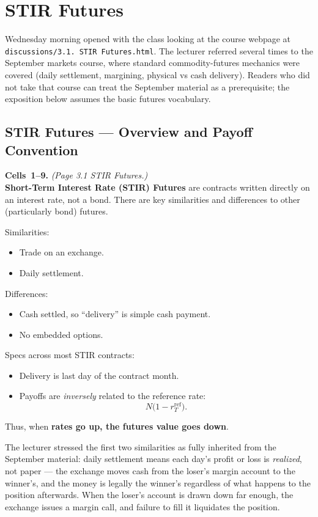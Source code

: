 \section{STIR Futures}\label{L3-sec:stir}

Wednesday morning opened with the class looking at the course webpage at
\texttt{discussions/3.1.~STIR Futures.html}. The lecturer referred several
times to the September markets course, where standard commodity-futures
mechanics were covered (daily settlement, margining, physical vs cash
delivery). Readers who did not take that course can treat the September
material as a prerequisite; the exposition below assumes the basic futures
vocabulary.

\subsection{STIR Futures --- Overview and Payoff Convention}\label{L3-sec:stir-overview}

\begin{keyblock}
\textbf{Cells~1--9.} \emph{(Page 3.1 \textperiodcentered{} STIR Futures.)}\\
\noindent \textbf{Short-Term Interest Rate (STIR) Futures} are contracts
written directly on an interest rate, not a bond.
There are key similarities and differences to other (particularly bond)
futures.

Similarities:
\begin{itemize}
  \item Trade on an exchange.
  \item Daily settlement.
\end{itemize}
Differences:
\begin{itemize}
  \item Cash settled, so ``delivery'' is simple cash payment.
  \item No embedded options.
\end{itemize}

Specs across most STIR contracts:
\begin{itemize}
  \item Delivery is last day of the contract month.
  \item Payoffs are \emph{inversely} related to the reference rate:
    \[
      N\bigl(1 - r^{\text{ref}}_T\bigr).
    \]
\end{itemize}
Thus, when \textbf{rates go up, the futures value goes down}.
\end{keyblock}

The lecturer stressed the first two similarities as fully inherited from
the September material: daily settlement means each day's profit or loss
is \emph{realized}, not paper --- the exchange moves cash from the loser's
margin account to the winner's, and the money is legally the winner's
regardless of what happens to the position afterwards. When the loser's
account is drawn down far enough, the exchange issues a margin call, and
failure to fill it liquidates the position.

